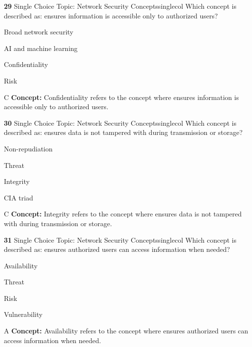 \documentclass[10pt,a4paper]{article}
\begin{document}
\begin{qcard}{\color{white}\textbf{29} \hfill \small Single Choice \textbar{} Topic: Network Security Concepts}{singlecol}
Which concept is described as: ensures information is accessible only to authorized users?

\begin{qoptions}
\item Broad network security
\item AI and machine learning
\item Confidentiality
\item Risk
\end{qoptions}
\begin{explainbox}{C}
\textbf{Concept:} Confidentiality refers to the concept where ensures information is accessible only to authorized users.
\end{explainbox}
\end{qcard}

\begin{qcard}{\color{white}\textbf{30} \hfill \small Single Choice \textbar{} Topic: Network Security Concepts}{singlecol}
Which concept is described as: ensures data is not tampered with during transmission or storage?

\begin{qoptions}
\item Non-repudiation
\item Threat
\item Integrity
\item CIA triad
\end{qoptions}
\begin{explainbox}{C}
\textbf{Concept:} Integrity refers to the concept where ensures data is not tampered with during transmission or storage.
\end{explainbox}
\end{qcard}

\begin{qcard}{\color{white}\textbf{31} \hfill \small Single Choice \textbar{} Topic: Network Security Concepts}{singlecol}
Which concept is described as: ensures authorized users can access information when needed?

\begin{qoptions}
\item Availability
\item Threat
\item Risk
\item Vulnerability
\end{qoptions}
\begin{explainbox}{A}
\textbf{Concept:} Availability refers to the concept where ensures authorized users can access information when needed.
\end{explainbox}
\end{qcard}
\end{document}
